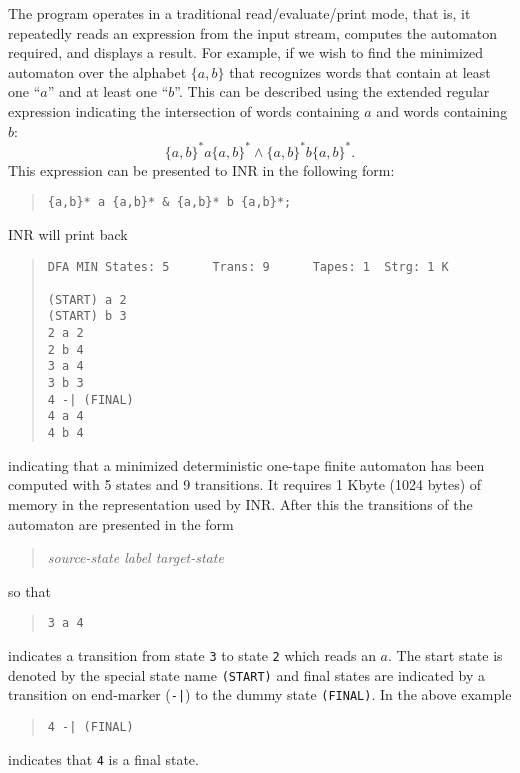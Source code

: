 The program operates in a traditional read/evaluate/print mode, that is, it
repeatedly reads an expression from the input stream, computes the
automaton required, and displays a result.
For example, if we wish to find the minimized automaton over the alphabet
$\{a,b\}$ that recognizes words that contain at least one ``$a$'' and at least
one ``$b$''.
This can be described using the extended regular expression indicating the
intersection of words containing $a$ and words containing $b$:
$$\{a,b\}^*a\{a,b\}^* \wedge \{a,b\}^*b\{a,b\}^*.$$
This expression can be presented to INR in the following form:
\begin{quote}
\begin{verbatim}
{a,b}* a {a,b}* & {a,b}* b {a,b}*;
\end{verbatim}
\end{quote}
INR will print back
\begin{quote}
\begin{verbatim}
DFA MIN States: 5      Trans: 9      Tapes: 1  Strg: 1 K

(START) a 2
(START) b 3
2 a 2
2 b 4
3 a 4
3 b 3
4 -| (FINAL)
4 a 4
4 b 4
\end{verbatim}
\end{quote}
indicating that a minimized deterministic one-tape finite automaton has been
computed with 5 states and 9 transitions.
It requires 1 Kbyte (1024 bytes) of memory in the representation used by INR.
After this the transitions of the automaton are presented in the form
\begin{quote}
{\it source-state \qquad label \qquad target-state}
\end{quote}
so that 
\begin{quote}
\begin{verbatim}
3 a 4
\end{verbatim}
\end{quote}
indicates a transition from state {\tt 3} to state {\tt 2} which reads an $a$.
The start state is denoted by the special state name {\tt (START)} and
final states are indicated by a transition on end-marker ({\tt -|}) to the
dummy state {\tt (FINAL)}.
In the above example
\begin{quote}
\begin{verbatim}
4 -| (FINAL)
\end{verbatim}
\end{quote}
indicates that {\tt 4} is a final state.

